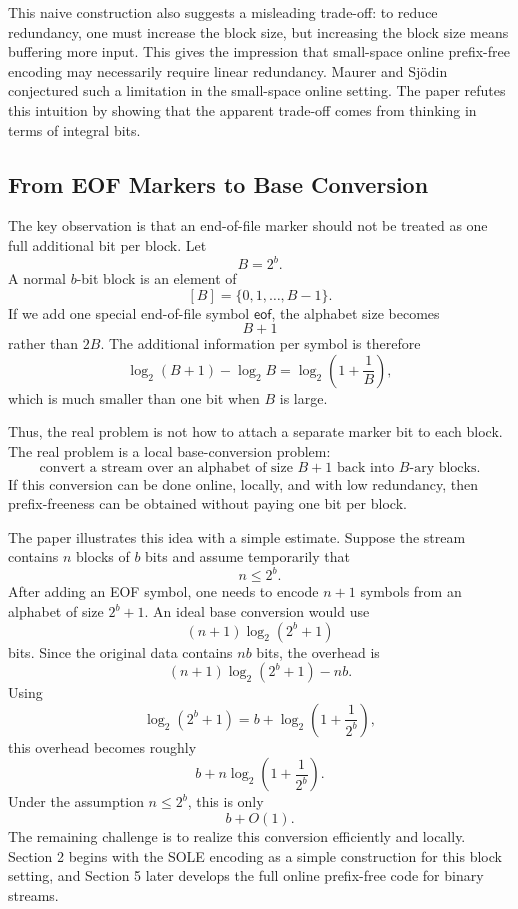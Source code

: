 This naive construction also suggests a misleading trade-off: to reduce redundancy, one must increase the block size, but increasing the block size means buffering more input. This gives the impression that small-space online prefix-free encoding may necessarily require linear redundancy. Maurer and Sjödin conjectured such a limitation in the small-space online setting. The paper refutes this intuition by showing that the apparent trade-off comes from thinking in terms of integral bits.

\subsection{From EOF Markers to Base Conversion}

The key observation is that an end-of-file marker should not be treated as one full additional bit per block. Let
\[
    B = 2^b.
\]
A normal \(b\)-bit block is an element of
\[
    [B] = \{0,1,\ldots,B-1\}.
\]
If we add one special end-of-file symbol \(\mathsf{eof}\), the alphabet size becomes
\[
    B + 1
\]
rather than \(2B\). The additional information per symbol is therefore
\[
    \log_2(B+1) - \log_2 B
    =
    \log_2\left(1+\frac{1}{B}\right),
\]
which is much smaller than one bit when \(B\) is large.

Thus, the real problem is not how to attach a separate marker bit to each block. The real problem is a local base-conversion problem:
\[
    \text{convert a stream over an alphabet of size } B+1
    \text{ back into } B\text{-ary blocks}.
\]
If this conversion can be done online, locally, and with low redundancy, then prefix-freeness can be obtained without paying one bit per block.

The paper illustrates this idea with a simple estimate. Suppose the stream contains \(n\) blocks of \(b\) bits and assume temporarily that
\[
    n \leq 2^b.
\]
After adding an EOF symbol, one needs to encode \(n+1\) symbols from an alphabet of size \(2^b+1\). An ideal base conversion would use
\[
    (n+1)\log_2(2^b+1)
\]
bits. Since the original data contains \(nb\) bits, the overhead is
\[
    (n+1)\log_2(2^b+1) - nb.
\]
Using
\[
    \log_2(2^b+1)
    =
    b + \log_2\left(1+\frac{1}{2^b}\right),
\]
this overhead becomes roughly
\[
    b + n\log_2\left(1+\frac{1}{2^b}\right).
\]
Under the assumption \(n \leq 2^b\), this is only
\[
    b + O(1).
\]
The remaining challenge is to realize this conversion efficiently and locally. Section 2 begins with the SOLE encoding as a simple construction for this block setting, and Section 5 later develops the full online prefix-free code for binary streams.

